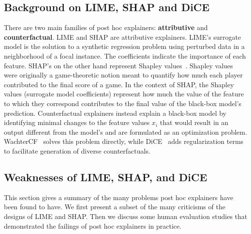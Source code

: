 \documentclass[11pt]{article}    %
\begin{document}
    \subsection{Background on LIME, SHAP and DiCE}
    There are two main families of post hoc explainers: \textbf{attributive} and \textbf{counterfactual}. 
    LIME and SHAP are attributive explainers. %
    LIME's  surrogate model is the solution to a synthetic regression problem using perturbed data in a neighborhood of a focal instance.  The coefficients indicate the importance of each feature. %
    SHAP's on the other hand represent Shapley values~\citep{shapley97shapley}. Shapley values were originally a game-theoretic notion meant to quantify how much each player contributed to the final score of a game. In the context of SHAP, the Shapley values (surrogate model coefficients) represent how much the value of the feature to which they correspond contributes to the final value of the black-box model's prediction.
  Counterfactual explainers instead explain a black-box model by identifying minimal changes to the feature values $x_i$ that would result in an output different from the model's and are formulated as an optimization problem. %
  WachterCF~\citep{wachter17wachtercf} solves this problem directly, while DiCE~\citep{mothilal20dice} adds regularization terms to facilitate generation of diverse counterfactuals. 

    \subsection{Weaknesses of LIME, SHAP, and DiCE}
        \label{sec:weaknesses}
        This section gives a summary of the many problems post hoc explainers have been found to have. We first present a subset of the many criticisms of the designs of LIME and SHAP. Then we discuss some human evaluation studies that demonstrated the failings of post hoc explainers in practice. 
\end{document}
